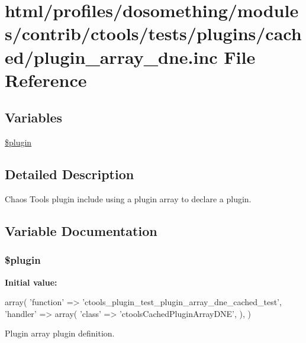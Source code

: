 \hypertarget{cached_2plugin__array__dne_8inc}{
\section{html/profiles/dosomething/modules/contrib/ctools/tests/plugins/cached/plugin\_\-array\_\-dne.inc File Reference}
\label{cached_2plugin__array__dne_8inc}
}
\subsection*{Variables}
\begin{DoxyCompactItemize}
\item 
\hyperlink{cached_2plugin__array__dne_8inc_ada8a7130088351710bb02ed622d6bf65}{\$plugin}
\end{DoxyCompactItemize}


\subsection{Detailed Description}
Chaos Tools plugin include using a plugin array to declare a plugin. 

\subsection{Variable Documentation}
\hypertarget{cached_2plugin__array__dne_8inc_ada8a7130088351710bb02ed622d6bf65}{
\subsubsection[{\$plugin}]{\setlength{\rightskip}{0pt plus 5cm}\$plugin}}
\label{cached_2plugin__array__dne_8inc_ada8a7130088351710bb02ed622d6bf65}
{\bfseries Initial value:}
\begin{DoxyCode}
 array(
  'function' => 'ctools_plugin_test_plugin_array_dne_cached_test',
  'handler' => array(
    'class' => 'ctoolsCachedPluginArrayDNE',
  ),
)
\end{DoxyCode}
Plugin array plugin definition. 